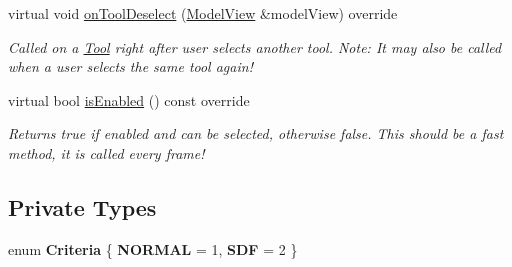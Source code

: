 \begin{DoxyCompactItemize}
\mbox{\label{classpepr3d_1_1_semiautomatic_segmentation_aa7992f161194bd23ddff96433819029d}} 
virtual void \mbox{\hyperlink{classpepr3d_1_1_semiautomatic_segmentation_aa7992f161194bd23ddff96433819029d}{on\+Tool\+Deselect}} (\mbox{\hyperlink{classpepr3d_1_1_model_view}{Model\+View}} \&model\+View) override
\begin{DoxyCompactList}\small\item\em Called on a \mbox{\hyperlink{classpepr3d_1_1_tool}{Tool}} right after user selects another tool. Note\+: It may also be called when a user selects the same tool again! \end{DoxyCompactList}\item 
\mbox{\label{classpepr3d_1_1_semiautomatic_segmentation_a5883c42824da8d5adec628e065e317b3}} 
virtual bool \mbox{\hyperlink{classpepr3d_1_1_semiautomatic_segmentation_a5883c42824da8d5adec628e065e317b3}{is\+Enabled}} () const override
\begin{DoxyCompactList}\small\item\em Returns true if enabled and can be selected, otherwise false. This should be a fast method, it is called every frame! \end{DoxyCompactList}\end{DoxyCompactItemize}
\subsection*{Private Types}
\begin{DoxyCompactItemize}
\item 
\mbox{\label{classpepr3d_1_1_semiautomatic_segmentation_a97a8b6061b26cb4dd67ac14eace1f30b}} 
enum {\bfseries Criteria} \{ {\bfseries N\+O\+R\+M\+AL} = 1, 
{\bfseries S\+DF} = 2
 \}
\end{DoxyCompactItemize}
